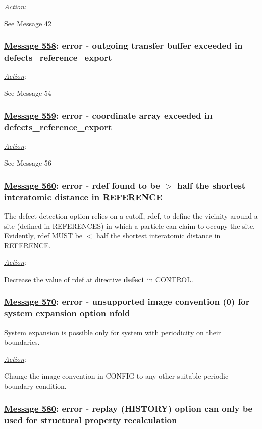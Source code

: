 \noindent \underline{\em Action}:

See Message 42

\subsubsection*{\underline{Message 558}: error - outgoing transfer buffer exceeded in defects\_reference\_export}

\noindent \underline{\em Action}:

See Message 54

\subsubsection*{\underline{Message 559}: error - coordinate array exceeded in defects\_reference\_export}

\noindent \underline{\em Action}:

See Message 56

\subsubsection*{\underline{Message 560}: error - rdef found to be $>$ half the shortest interatomic distance in REFERENCE}

The defect detection option relies on a cutoff, rdef, to define the
vicinity around a site (defined in REFERENCES) in which a particle
can claim to occupy the site.  Evidently, rdef MUST be $<$ half the
shortest interatomic distance in REFERENCE.

\noindent \underline{\em Action}:

Decrease the value of rdef at directive {\bf defect} in CONTROL.

\subsubsection*{\underline{Message 570}: error - unsupported image convention (0) for system expansion option nfold}

System expansion is possible only for system with periodicity on
their boundaries.

\noindent \underline{\em Action}:

Change the image convention in CONFIG to any other suitable periodic
boundary condition.

\subsubsection*{\underline{Message 580}: error - replay (HISTORY) option can only be used for structural property recalculation}

